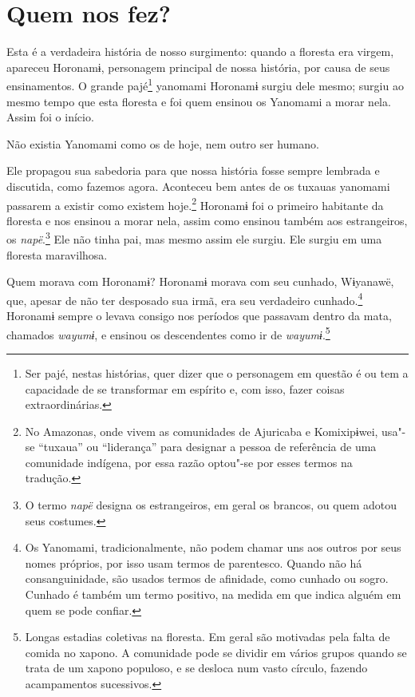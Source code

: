  

\section{Quem nos fez?}

Esta é a verdadeira história de nosso surgimento: quando a floresta era
virgem, apareceu Horonamɨ, personagem principal de nossa história, por
causa de seus ensinamentos. O grande pajé\footnote{  Ser pajé, nestas histórias, quer dizer que o personagem em questão é ou
tem a capacidade de se transformar em espírito e, com isso, fazer coisas
extraordinárias.}  yanomami
Horonamɨ surgiu dele mesmo; surgiu ao mesmo tempo que esta floresta e
foi quem ensinou os Yanomami a morar nela. Assim foi o início. 

Não existia Yanomami como os de hoje, nem outro ser humano. 

Ele propagou sua sabedoria para que nossa história fosse sempre lembrada
e discutida, como fazemos agora. Aconteceu bem antes de os tuxauas
yanomami passarem a existir como existem
hoje.\footnote{  No Amazonas, onde vivem as comunidades de Ajuricaba e Komixipɨwei,
usa"-se ``tuxaua'' ou ``liderança'' para designar a pessoa de referência
de uma comunidade indígena, por essa razão optou"-se por esses termos na
tradução.}  Horonamɨ foi o primeiro habitante da floresta e
nos ensinou a morar nela, assim como ensinou também aos estrangeiros,
os \emph{napë}.\footnote{   O termo \emph{napë} designa os estrangeiros, em geral os brancos, ou quem adotou seus costumes.}  Ele não tinha pai, mas mesmo assim
ele surgiu. Ele surgiu em uma floresta maravilhosa. 

Quem morava com Horonamɨ? Horonamɨ morava com seu cunhado, Wɨyanawë,
que, apesar de não ter desposado sua irmã, era seu verdadeiro
cunhado.\footnote{  Os Yanomami, tradicionalmente, não podem chamar uns aos outros por seus nomes próprios, por isso usam termos de parentesco. Quando não há
consanguinidade, são usados termos de afinidade, como cunhado ou sogro.
Cunhado é também um termo positivo, na medida em que indica alguém em
quem se pode confiar.} Horonamɨ sempre o levava consigo nos
períodos que passavam dentro da mata, chamados \emph{wayumɨ}, e ensinou
os descendentes como ir de \emph{wayumɨ}.\footnote{   Longas estadias coletivas na floresta. Em geral são motivadas pela falta de comida no xapono. A comunidade pode se dividir em vários grupos quando se trata de um xapono populoso, e se desloca num vasto círculo, fazendo acampamentos sucessivos.}

